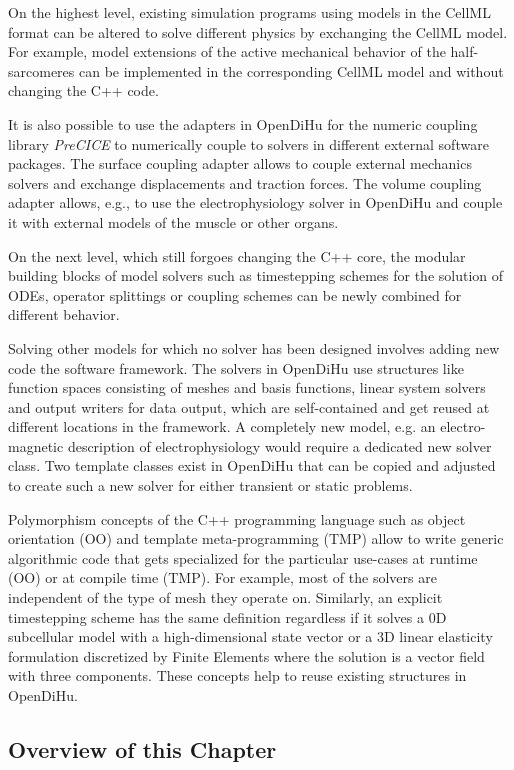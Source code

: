 On the highest level, existing simulation programs using models in the CellML format can be altered to solve different physics by exchanging the CellML model. For example, model extensions of the active mechanical behavior of the half-sarcomeres can be implemented in the corresponding CellML model and without changing the C++ code.

It is also possible to use the adapters in OpenDiHu for the numeric coupling library \emph{PreCICE} \cite{precice} to numerically couple to solvers in different external software packages. The surface coupling adapter allows to couple external mechanics solvers and exchange displacements and traction forces. The volume coupling adapter allows, e.g., to use the electrophysiology solver in OpenDiHu and couple it with external models of the muscle or other organs.

On the next level, which still forgoes changing the C++ core, the modular building blocks of model solvers such as timestepping schemes for the solution of ODEs, operator splittings or coupling schemes can be newly combined for different behavior.

Solving other models for which no solver has been designed involves adding new code the software framework.
The solvers in OpenDiHu use structures like function spaces consisting of meshes and basis functions, linear system solvers and output writers for data output, which are self-contained and get reused at different locations in the framework. A completely new model, e.g. an electro-magnetic description of electrophysiology would require a dedicated new solver class. 
Two template classes exist in OpenDiHu that can be copied and adjusted to create such a new solver for either transient or static problems.

Polymorphism concepts of the C++ programming language such as object orientation (OO) and template meta-programming (TMP) allow to write generic algorithmic code that gets specialized for the particular use-cases at runtime (OO) or at compile time (TMP). For example, most of the solvers are independent of the type of mesh they operate on. Similarly, an explicit timestepping scheme has the same definition regardless if it solves a 0D subcellular model with a high-dimensional state vector or a 3D linear elasticity formulation discretized by Finite Elements where the solution is a vector field with three components.
These concepts help to reuse existing structures in OpenDiHu.

\subsection{Overview of this Chapter}

